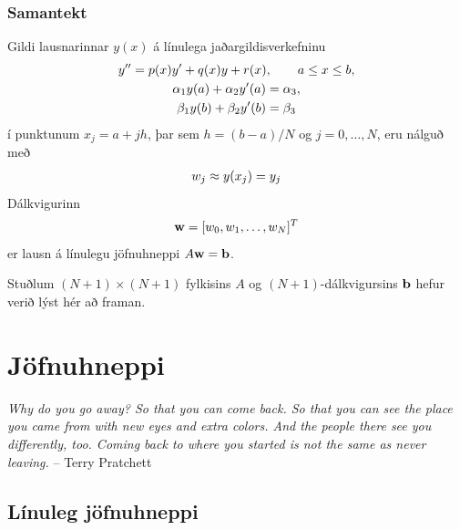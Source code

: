 \documentclass[letterpaper,10pt,icelandic]{sphinxmanual}
\begin{document}
\subsection{Samantekt}
\label{kafli07:index-5}\label{kafli07:samantekt}
Gildi lausnarinnar \(y(x)\) á línulega jaðargildisverkefninu
\begin{gather}
\begin{split}\begin{gathered}
    y''=p(x)y'+q(x)y+r(x), \qquad a\leq x\leq b,\\
\alpha_1y(a)+\alpha_2 y'(a)=\alpha_3,\\
\beta_1 y(b)+\beta_2y'(b)=\beta_3
  \end{gathered}\end{split}\notag
\end{gather}
í punktunum \(x_j=a+jh\), þar sem \(h=(b-a)/N\) og
\(j=0,\dots,N\), eru nálguð með
\begin{gather}
\begin{split}w_j\approx y(x_j)=y_j\end{split}\notag
\end{gather}
Dálkvigurinn
\begin{gather}
\begin{split}{\mbox{${\bf w}$}}=[w_0,w_1,\dots,w_N]^T\end{split}\notag
\end{gather}
er lausn á línulegu jöfnuhneppi
\(A{\mbox{${\bf w}$}}={\mbox{${\bf b}$}}\).

Stuðlum \((N+1)\times(N+1)\) fylkisins \(A\) og
\((N+1)\)-dálkvigursins \({\mbox{${\bf b}$}}\) hefur verið lýst
hér að framan.
\label{kafli08:upphafsgildisverkefni}

\chapter{Jöfnuhneppi}
\label{kafli08:jofnuhneppi}\label{kafli08::doc}\label{kafli08:index-0}
\emph{Why do you go away? So that you can come back. So that you can see the place you came from with new eyes and extra colors. And the people there see you differently, too. Coming back to where you started is not the same as never leaving.}
-- Terry Pratchett


\section{Línuleg jöfnuhneppi}
\label{kafli08:linuleg-jofnuhneppi}
\end{document}

